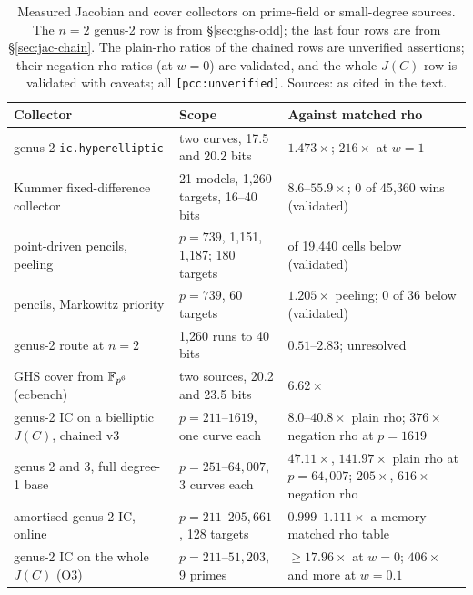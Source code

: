 \begin{table}[t]
\centering\small
\begin{tabularx}{\linewidth}{@{}>{\raggedright}p{3.6cm}>{\raggedright}X>{\raggedright\arraybackslash}p{3.1cm}@{}}
\toprule
Collector & Scope & Against matched rho \\
\midrule
genus-2 \texttt{ic.hyperelliptic} & two curves, 17.5 and 20.2 bits & $1.473\times$; $216\times$ at $w=1$ \\
Kummer fixed-difference collector & 21 models, 1{,}260 targets, 16--40 bits & $8.6$--$55.9\times$; 0 of 45{,}360 wins (validated) \\
point-driven pencils, peeling & $p=739$, 1{,}151, 1{,}187; 180 targets & 0 of 19{,}440 cells below (validated) \\
pencils, Markowitz priority & $p=739$, 60 targets & $1.205\times$ peeling; 0 of 36 below (validated) \\
genus-2 route at $n=2$ & 1{,}260 runs to 40 bits & $0.51$--$2.83$; unresolved \\
GHS cover from $\mathbb{F}_{p^6}$ (ecbench) & two sources, 20.2 and 23.5 bits & $6.62\times$ \\
genus-2 IC on a bielliptic $J(C)$, chained v3 & $p=211$--$1619$, one curve each & $8.0$--$40.8\times$ plain rho; $376\times$ negation rho at $p=1619$ \\
genus 2 and 3, full degree-1 base & $p=251$--$64{,}007$, 3 curves each & $47.11\times$, $141.97\times$ plain rho at $p=64{,}007$; $205\times$, $616\times$ negation rho \\
amortised genus-2 IC, online & $p=211$--$205{,}661$, 128 targets & $0.999$--$1.111\times$ a memory-matched rho table \\
genus-2 IC on the whole $J(C)$ (O3) & $p=211$--$51{,}203$, 9 primes & $\ge17.96\times$ at $w=0$; $406\times$ and more at $w=0.1$ \\
\bottomrule
\end{tabularx}
\caption[]{Measured Jacobian and cover collectors on prime-field or
small-degree sources. The $n=2$ genus-2 row is from
\S\ref{sec:ghs-odd}; the last four rows are from \S\ref{sec:jac-chain}. The
plain-rho ratios of the chained rows are unverified assertions; their
negation-rho ratios (at $w=0$) are validated, and the whole-$J(C)$ row is
validated with caveats; all \texttt{[pcc:unverified]}. Sources: as cited in
the text.}
\label{tab:jac-samefield}
\end{table}

